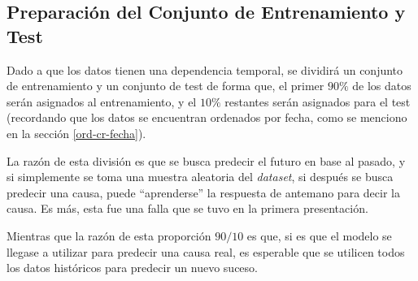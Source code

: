 




\subsection{Preparación del Conjunto de Entrenamiento y Test}\label{prep-train-test}
Dado a que los datos tienen una dependencia temporal, se dividirá un conjunto de entrenamiento y un conjunto de test de forma que, el primer $90\%$ de los datos serán asignados al entrenamiento, y el $10\%$ restantes serán asignados para el test (recordando que los datos se encuentran ordenados por fecha, como se menciono en la sección \ref{ord-cr-fecha}). 

La razón de esta división es que se busca predecir el futuro en base al pasado, y si simplemente se toma una muestra aleatoria del \textit{dataset}, si después se busca predecir una causa, puede ``aprenderse'' la respuesta de antemano para decir la causa. Es más, esta fue una falla que se tuvo en la primera presentación.

Mientras que la razón de esta proporción $90/10$ es que, si es que el modelo se llegase a utilizar para predecir una causa real, es esperable que se utilicen todos los datos históricos para predecir un nuevo suceso.




